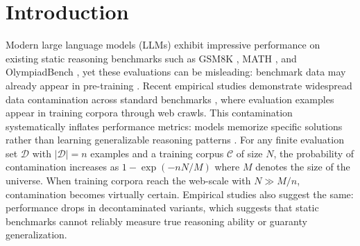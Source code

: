 \documentclass{article} %
\theoremstyle{plain}
\theoremstyle{definition}
\begin{document}
\doparttoc %
\faketableofcontents %



\section{Introduction}  

Modern large language models (LLMs) exhibit impressive performance on existing static reasoning benchmarks such as GSM8K \citep{cobbe2021gsm8k}, MATH \citep{hendrycks2021math}, and OlympiadBench \citep{he2024olympiadbenchchallengingbenchmarkpromoting}, yet these evaluations can be misleading: benchmark data may already appear in pre-training \citep{wu2025reasoning}. Recent empirical studies demonstrate widespread data contamination across standard benchmarks \citep{xu2024survey,cheng2025contam, chen2025recentadvanceslargelangauge, golchin2025datacontaminationquiztool, choi2025contaminatedbenchmarkquantifyingdataset, deng-etal-2024-investigating}, where evaluation examples appear in training corpora through web crawls. This contamination systematically inflates performance metrics: models memorize specific solutions rather than learning generalizable reasoning patterns \citep{shojaee2025illusion,opus2025illusion}. For any finite evaluation set $\mathcal{D}$ with $|\mathcal{D}| = n$ examples and a training corpus $\mathcal{C}$ of size $N$, the probability of contamination increases as $1 - \exp(-nN/M)$ where $M$ denotes the size of the universe. When training corpora reach the web-scale with $N \gg M/n$, contamination becomes virtually certain. Empirical studies \citep{shojaee2025illusion, varela2025rethinkingillusionthinking} also suggest the same: performance drops in decontaminated variants, which suggests that static benchmarks cannot reliably measure true reasoning ability or guaranty generalization. 
\end{document}

